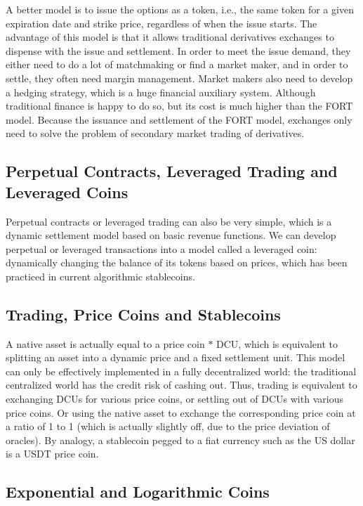 \documentclass[letterpaper,12pt]{article}
\begin{document}
A better model is to issue the options as a token, i.e., the same token for a given expiration date and strike price, regardless of when the issue starts. 
The advantage of this model is that it allows traditional derivatives exchanges to dispense with the issue and settlement. 
In order to meet the issue demand, they either need to do a lot of matchmaking or find a market maker, and in order to settle, they often need margin management. 
Market makers also need to develop a hedging strategy, which is a huge financial auxiliary system. 
Although traditional finance is happy to do so, but its cost is much higher than the FORT model. 
Because the issuance and settlement of the FORT model, exchanges only need to solve the problem of secondary market trading of derivatives.

\subsection{Perpetual Contracts, Leveraged Trading and Leveraged Coins}

Perpetual contracts or leveraged trading can also be very simple, which is a dynamic settlement model based on basic revenue functions. 
We can develop perpetual or leveraged transactions into a model called a leveraged coin: dynamically changing the balance of its tokens based on prices, which has been practiced in current algorithmic stablecoins.

\subsection{Trading, Price Coins and Stablecoins}

A native asset is actually equal to a price coin $*$ DCU, which is equivalent to splitting an asset into a dynamic price and a fixed settlement unit. 
This model can only be effectively implemented in a fully decentralized world: the traditional centralized world has the credit risk of cashing out. 
Thus, trading is equivalent to exchanging DCUs for various price coins, or settling out of DCUs with various price coins. 
Or using the native asset to exchange the corresponding price coin at a ratio of 1 to 1 (which is actually slightly off, due to the price deviation of oracles). 
By analogy, a stablecoin pegged to a fiat currency such as the US dollar is a USDT price coin.

\subsection{Exponential and Logarithmic Coins}
\end{document}
